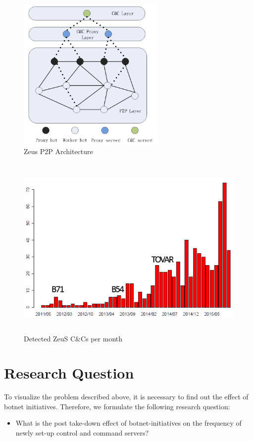 \documentclass{sig-alternate-br}
\begin{document}
\begin{figure}[!h]
	\centering
    \includegraphics[width=\columnwidth,height=7.5cm,keepaspectratio]{zeusp2p.png}
    \caption{Zeus P2P Architecture\cite{Wang198273490}}
    \label{fig:zeusarchitecture}
\end{figure}

\FloatBarrier

\begin{figure}[!ht]
	\centering
    \includegraphics[height=9cm]{zeusdetection1.png}
    \caption{Detected ZeuS C\&Cs per month}
    \label{fig:detectedzeus}
\end{figure}

\FloatBarrier
\section{Research Question}
To visualize the problem described above, it is necessary to find out the effect of botnet initiatives. Therefore, we formulate the following research question:
\begin{itemize}
\item What is the post take-down effect of botnet-initiatives on the frequency of newly set-up control and command servers?
\end{itemize}
\end{document}

